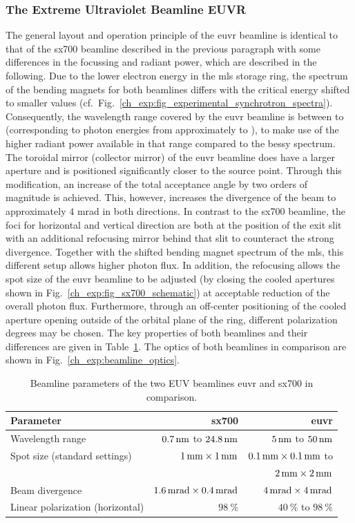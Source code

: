 \subsubsection{The Extreme Ultraviolet Beamline EUVR}
The general layout and operation principle of the \gls{euvr} beamline is identical to that of the \gls{sx700} beamline described in the previous paragraph with some differences in the focussing and radiant power, which are described in the following. Due to the lower electron energy in the \gls{mls} storage ring, the spectrum of the bending magnets for both beamlines differs with the critical energy shifted to smaller values (cf.~Fig.~\ref{ch_exp:fig_experimental_synchrotron_spectra}). Consequently, the wavelength range covered by the \gls{euvr} beamline is between  to  (corresponding to photon energies from approximately  to ), to make use of the higher radiant power available in that range compared to the \gls{bessy} spectrum. The toroidal mirror (collector mirror) of the \gls{euvr} beamline does have a larger aperture and is positioned significantly closer to the source point. Through this modification, an increase of the total acceptance angle by two orders of magnitude is achieved. This, however, increases the divergence of the beam to approximately $4$ mrad in both directions. In contrast to the \gls{sx700} beamline, the foci for horizontal and vertical direction are both at the position of the exit slit with an additional refocusing mirror behind that slit to counteract the strong divergence. Together with the shifted bending magnet spectrum of the \gls{mls}, this different setup allows higher photon flux. In addition, the refocusing allows the spot size of the \gls{euvr} beamline to be adjusted (by closing the cooled apertures shown in Fig.~\ref{ch_exp:fig_sx700_schematic}) at acceptable reduction of the overall photon flux. Furthermore, through an off-center positioning of the cooled aperture opening outside of the orbital plane of the ring, different polarization degrees may be chosen. The key properties of both beamlines and their differences are given in Table~\ref{ch_exp:tbl_beamline_properties}. The optics of both beamlines in comparison are shown in Fig.~\ref{ch_exp:beamline_optics}.
\begin{table}
\centering
\begin{tabular}{lrr}
\toprule
Parameter 			& \gls{sx700} 		& \gls{euvr}\\ \midrule
Wavelength range 		& $\nm{0.7}$ to $\nm{24.8}$ 	& $\nm{5}$ to $\nm{50}$\\
Spot size (standard settings)			& $\mm{1} \times \mm{1}$ 		& $\mm{0.1} \times \mm{0.1}$ to\\ 
&&$\mm{2} \times \mm{2}$\\
Beam divergence			& $\SI{1.6}{\milli\radian}\times \SI{0.4}{\milli\radian}$ 	& $\SI{4}{\milli\radian}\times \SI{4}{\milli\radian}$\\
Linear polarization (horizontal)	& $\SI{98}{\percent}$ 		& $\SI{40}{\percent}$ to $\SI{98}{\percent}$\\
 \bottomrule
\end{tabular}
\caption{Beamline parameters of the two EUV beamlines \gls{euvr} and \gls{sx700} in comparison.}
\label{ch_exp:tbl_beamline_properties}
\end{table}
